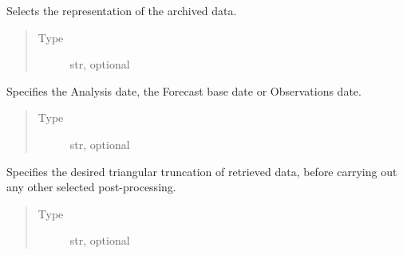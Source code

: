 \documentclass[letterpaper,10pt,english]{sphinxmanual}
\begin{document}
\begin{fulllineitems}
\begin{fulllineitems}
\end{fulllineitems}


\begin{fulllineitems}
\label{\detokenize{api:MarsRetrieval.MarsRetrieval.repres}}
Selects the representation of the archived data.
\begin{quote}\begin{description}
\item[{Type}] \leavevmode
str, optional

\end{description}\end{quote}

\end{fulllineitems}


\begin{fulllineitems}
\label{\detokenize{api:MarsRetrieval.MarsRetrieval.date}}
Specifies the Analysis date, the Forecast base date or
Observations date.
\begin{quote}\begin{description}
\item[{Type}] \leavevmode
str, optional

\end{description}\end{quote}

\end{fulllineitems}


\begin{fulllineitems}
\label{\detokenize{api:MarsRetrieval.MarsRetrieval.resol}}
Specifies the desired triangular truncation of retrieved data,
before carrying out any other selected post-processing.
\begin{quote}\begin{description}
\item[{Type}] \leavevmode
str, optional

\end{description}\end{quote}


\end{fulllineitems}
\end{fulllineitems}
\end{document}
